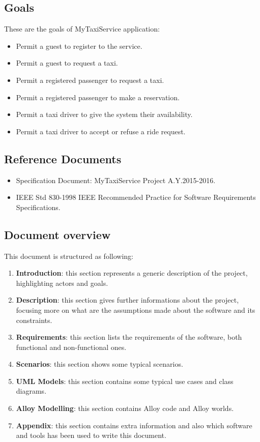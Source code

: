 \documentclass[11pt,a4paper,titlepage]{article}
\begin{document}
\subsection{Goals}
These are the goals of MyTaxiService application:
\begin{itemize}
	\item Permit a guest to register to the service.
	\item Permit a guest to request a taxi.
	\item Permit a registered passenger to request a taxi.
	\item Permit a registered passenger to make a reservation.
	\item Permit a taxi driver to give the system their availability.
	\item Permit a taxi driver to accept or refuse a ride request.
\end{itemize}
\subsection{Reference Documents}
\begin{itemize}
	\item Specification Document: MyTaxiService Project A.Y.2015-2016.
	\item IEEE Std 830-1998 IEEE Recommended Practice for Software Requirements Specifications.
\end{itemize}
\subsection{Document overview}
This document is structured as following:
\begin{enumerate}
	\item \textbf{Introduction}: this section represents a generic description of the project, highlighting actors and goals.
	\item \textbf{Description}: this section gives further informations about the project, focusing more on what are the assumptions made about the software and its constraints.
	\item \textbf{Requirements}: this section lists the requirements of the software, both functional and non-functional ones.
	\item \textbf{Scenarios}: this section shows some typical scenarios.
	\item \textbf{UML Models}: this section contains some typical use cases and class diagrams.
	\item \textbf{Alloy Modelling}: this section contains Alloy code and Alloy worlds.
	\item \textbf{Appendix}: this section contains extra information and also which software and tools has been used to write this document.
\end{enumerate}
\end{document}
